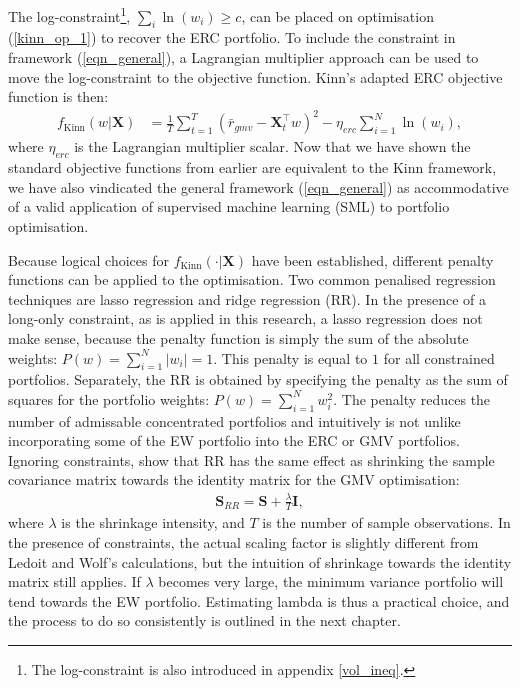 \documentclass[a4paper,11pt,nocenter,bold,noupper,headcount]{mythesis}
\theoremstyle{plain}
\theoremstyle{definition}
\begin{document}
The log-constraint\footnote{The log-constraint is also introduced in appendix \ref{vol_ineq}.}, $\sum_i \ln(w_i) \geq c$, can be placed on optimisation (\ref{kinn_op_1}) to recover the ERC portfolio. To include the constraint in framework (\ref{eqn_general}), a Lagrangian multiplier approach can be used to move the log-constraint to the objective function. Kinn's adapted ERC objective function is then:
\begin{align}
f_{\text{Kinn}}(w|\textbf{X}) &= \frac{1}{T} \sum_{t = 1}^T  (\bar{r}_{gmv} - \textbf{X}^\intercal_t w)^2 -\eta_{erc}\sum_{i = 1}^N \ln(w_i),
\end{align}
where $\eta_{erc}$ is the Lagrangian multiplier scalar. Now that we have shown the standard objective functions from earlier are equivalent to the Kinn framework, we have also vindicated the general framework (\ref{eqn_general}) as accommodative of a valid application of supervised machine learning (SML) to portfolio optimisation.

Because logical choices for $f_{\text{Kinn}}(\cdot|\textbf{X})$ have been established, different penalty functions can be applied to the optimisation. Two common penalised regression techniques are lasso regression and ridge regression (RR). In the presence of a long-only constraint, as is applied in this research, a lasso regression does not make sense, because the penalty function is simply the sum of the absolute weights: $P(w) = \sum_{i=  1}^N |w_i|  =1$. This penalty is equal to $1$ for all constrained portfolios. Separately, the RR is obtained by specifying the penalty as the sum of squares for the portfolio weights: $P(w) = \sum_{i=  1}^N w_i^2$. The penalty reduces the number of admissable concentrated portfolios and intuitively is not unlike incorporating some of the EW portfolio into the ERC or GMV portfolios. Ignoring constraints, \cite{LW04} show that RR has the same effect as shrinking the sample covariance matrix towards the identity matrix for the GMV optimisation:
\begin{align}
\textbf{S}_{RR} = \textbf{S} + \frac{\lambda}{T} \textbf{I}, 
\end{align}
where $\lambda$ is the shrinkage intensity, and $T$ is the number of sample observations. In the presence of constraints, the actual scaling factor is slightly different from Ledoit and Wolf's calculations, but the intuition of shrinkage towards the identity matrix still applies. If $\lambda$ becomes very large, the minimum variance portfolio will tend towards the EW portfolio. Estimating lambda is thus a practical choice, and the process to do so consistently is outlined in the next chapter.
\end{document}
